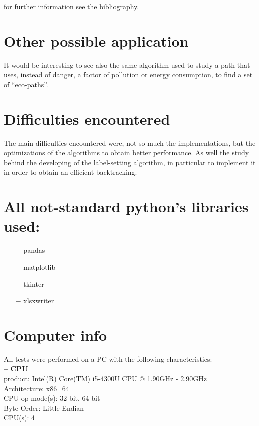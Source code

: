 \documentclass[a4paper,11pt]{report}
\begin{document}
for further information see the bibliography.

\section{Other possible application}
It would be interesting to see also the same algorithm used to study a path that uses, instead of danger, a factor of pollution or energy consumption, to find a set of ``eco-paths''.


\section{Difficulties encountered}
The main difficulties encountered were, not so much the implementations, but the optimizations of the algorithms to obtain better performance. As well the study behind the developing of the label-setting algorithm, in particular to implement it in order to obtain an efficient backtracking. 


\section{All not-standard python's libraries used:}
\begin{itemize}
	\item[$-$] pandas
	\item[$-$] matplotlib
	\item[$-$] tkinter
	\item[$-$] xlsxwriter
\end{itemize}
\nocite{*}

\section{Computer info}
All tests were performed on a PC with the following characteristics:\\
\textbf{-- CPU\\}
product:\hspace{17mm}        Intel(R) Core(TM) i5-4300U CPU @ 1.90GHz - 2.90GHz\\
Architecture:\hspace{9mm}   x86\_64\\
CPU op-mode(s):\hspace{2mm}  32-bit, 64-bit\\
Byte Order:\hspace{11mm}     Little Endian\\
CPU(s):\hspace{18mm}         4\\




\end{document}
